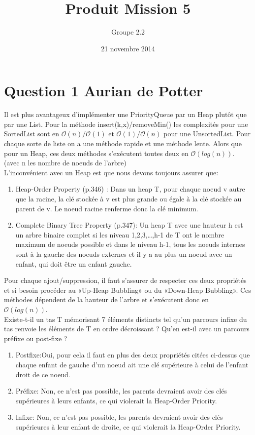 \documentclass[10pt,a4paper]{article}
\date{21 novembre 2014}
\author{Groupe 2.2}
\title{Produit Mission 5}
\begin{document}
\maketitle
\section*{Question 1 Aurian de Potter}
Il est plus avantageux d'implémenter une PriorityQueue par un Heap plutôt que par une List. Pour la méthode insert(k,x)/removeMin() les complexités pour une SortedList sont en $\mathcal{O}(n)/\mathcal{O}(1)$ et $\mathcal{O}(1)/\mathcal{O}(n)$ pour une UnsortedList. Pour chaque sorte de liste on a une méthode rapide et une méthode lente. Alors que pour un Heap, ces deux méthodes s'exécutent toutes deux en $\mathcal{O}(log(n))$. (avec n les nombre de noeuds de l'arbre)\\
L'inconvénient avec un Heap est que nous devons toujours assurer que:
\begin{enumerate}
\item Heap-Order Property (p.346) : Dans un heap T, pour chaque noeud v autre que la racine, la clé stockée à v est plus grande ou égale à la clé stockée au parent de v. Le noeud racine renferme donc la clé minimum.
\item Complete Binary Tree Property (p.347): Un heap T avec une hauteur h est un arbre binaire complet si les niveau 1,2,3,…,h-1 de T ont le nombre maximum de noeuds possible et dans le niveau h-1, tous les noeuds internes sont à la gauche des noeuds externes et il y a au plus un noeud avec un enfant, qui doit être un enfant gauche.
\end{enumerate}
Pour chaque ajout/suppression, il faut s'assurer de respecter ces deux propriétés et si besoin procéder au «Up-Heap Bubbling» ou du «Down-Heap Bubbling». Ces méthodes dépendent de la hauteur de l'arbre et s'exécutent donc en $\mathcal{O}(log(n))$.\\
Existe-t-il un tas T mémorisant 7 éléments distincts tel qu'un parcours infixe du
tas renvoie les éléments de T en ordre décroissant ? Qu'en est-il avec un parcours
préfixe ou post-fixe ?
\begin{enumerate}
\item{Postfixe}:Oui, pour cela il faut en plus des deux propriétés citées ci-dessus que chaque enfant de gauche d'un noeud ait une clé supérieure à celui de l'enfant droit de ce noeud.
\item{Préfixe}: Non, ce n'est pas possible, les parents devraient avoir des clés supérieures à leurs enfants, ce qui violerait la Heap-Order Priority.
\item{Infixe}: Non, ce n'est pas possible, les parents devraient avoir des clés supérieures à leur enfant de droite, ce qui violerait la Heap-Order Priority.
\end{enumerate}
\end{document}
